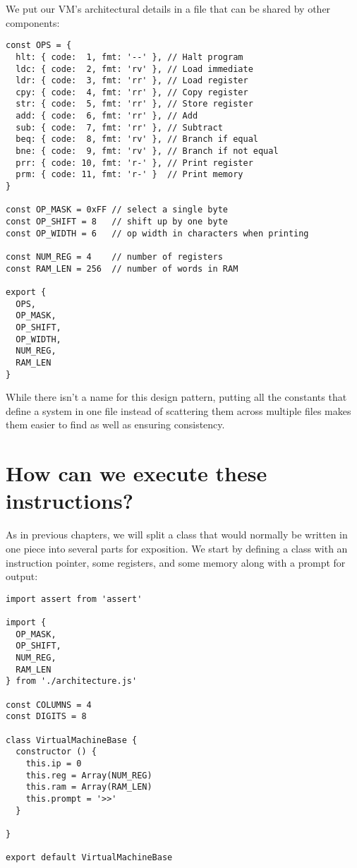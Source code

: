 \documentclass[krantzl]{krantz}
\begin{document}
\newpage


We put our VM’s architectural details in a file
that can be shared by other components:


\begin{lstlisting}[frame=tblr]
const OPS = {
  hlt: { code:  1, fmt: '--' }, // Halt program
  ldc: { code:  2, fmt: 'rv' }, // Load immediate
  ldr: { code:  3, fmt: 'rr' }, // Load register
  cpy: { code:  4, fmt: 'rr' }, // Copy register
  str: { code:  5, fmt: 'rr' }, // Store register
  add: { code:  6, fmt: 'rr' }, // Add
  sub: { code:  7, fmt: 'rr' }, // Subtract
  beq: { code:  8, fmt: 'rv' }, // Branch if equal
  bne: { code:  9, fmt: 'rv' }, // Branch if not equal
  prr: { code: 10, fmt: 'r-' }, // Print register
  prm: { code: 11, fmt: 'r-' }  // Print memory
}

const OP_MASK = 0xFF // select a single byte
const OP_SHIFT = 8   // shift up by one byte
const OP_WIDTH = 6   // op width in characters when printing

const NUM_REG = 4    // number of registers
const RAM_LEN = 256  // number of words in RAM

export {
  OPS,
  OP_MASK,
  OP_SHIFT,
  OP_WIDTH,
  NUM_REG,
  RAM_LEN
}
\end{lstlisting}



\noindent While there isn’t a name for this design pattern,
putting all the constants that define a system in one file
instead of scattering them across multiple files
makes them easier to find as well as ensuring consistency.

\section{How can we execute these instructions?}\label{virtual-machine-execute}


As in previous chapters,
we will split a class that would normally be written in one piece into several parts for exposition.
We start by defining a class with an instruction pointer, some registers, and some memory
along with a prompt for output:


\begin{lstlisting}[frame=tblr]
import assert from 'assert'

import {
  OP_MASK,
  OP_SHIFT,
  NUM_REG,
  RAM_LEN
} from './architecture.js'

const COLUMNS = 4
const DIGITS = 8

class VirtualMachineBase {
  constructor () {
    this.ip = 0
    this.reg = Array(NUM_REG)
    this.ram = Array(RAM_LEN)
    this.prompt = '>>'
  }

}

export default VirtualMachineBase
\end{lstlisting}
\end{document}
